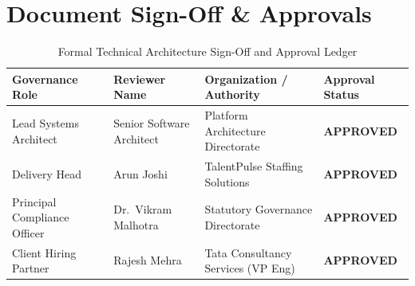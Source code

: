 \documentclass[11pt,a4paper,oneside]{report}
\begin{document}
\chapter{Document Sign-Off \& Approvals}

\begin{table}[H]
\centering
\small
\renewcommand{\arraystretch}{1.3}
\begin{tabularx}{\textwidth}{@{} p{4.2cm} p{3.2cm} p{3.6cm} X @{}}
    \toprule
    \textbf{Governance Role} & \textbf{Reviewer Name} & \textbf{Organization / Authority} & \textbf{Approval Status} \\
    \midrule
    Lead Systems Architect & Senior Software Architect & Platform Architecture Directorate & \textbf{APPROVED} \\
    Delivery Head & Arun Joshi & TalentPulse Staffing Solutions & \textbf{APPROVED} \\
    Principal Compliance Officer & Dr.\ Vikram Malhotra & Statutory Governance Directorate & \textbf{APPROVED} \\
    Client Hiring Partner & Rajesh Mehra & Tata Consultancy Services (VP Eng) & \textbf{APPROVED} \\
    \bottomrule
\end{tabularx}
\caption{Formal Technical Architecture Sign-Off and Approval Ledger}
\end{table}
\end{document}
